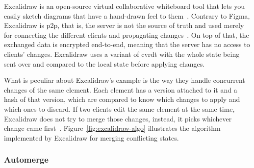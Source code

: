 \begin{toexclude}

Excalidraw is an open-source virtual collaborative whiteboard tool that lets you easily sketch diagrams that have a hand-drawn feel to them~\autocite{noauthor_rethinking_nodate}.
Contrary to Figma, Excalidraw is \acrfull{p2p}, that is, the server is not the source of truth and used merely for connecting the different clients and propagating changes~\autocite{noauthor_building_nodate}.
On top of that, the exchanged data is encrypted end-to-end, meaning that the server has no access to clients' changes.
Excalidraw uses a variant of \acrfull{cvrdt} with the whole state being sent over and compared to the local state before applying changes.


What is peculiar about Excalidraw's example is the way they handle concurrent changes of the same element. Each element has a version attached to it and a hash of that version, which are compared to know which changes to apply and which ones to discard. If two clients edit the same element at the same time, Excalidraw does not try to merge those changes, instead, it picks whichever change came first~\autocite{noauthor_building_nodate}.
Figure~\ref{fig:excalidraw-algo} illustrates the algorithm implemented by Excalidraw for merging conflicting states.


\subsubsection{Automerge}


\end{toexclude}
